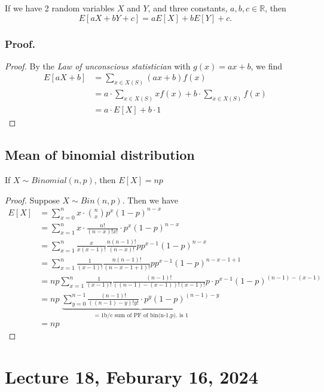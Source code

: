 \documentclass[
]{book}
\theoremstyle{definition}
\theoremstyle{definition}
\theoremstyle{definition}
\theoremstyle{definition}
\theoremstyle{remark}
\begin{document}
If we have 2 random variables \(X\) and \(Y\), and three constants, \(a,b,c\in \mathbb{R}\), then
\[
  E[aX+bY + c] = aE[X] + bE[Y] +c.
\]

\subsection{Proof.}\label{proof.}

\begin{proof}
By the \emph{Law of unconscious statistician} with \(g(x)=ax+b\), we find
\begin{align*}
E[aX+b] &=\sum_{x\in X(S)} (ax+b) f(x)\\
& = a \cdot  \sum_{x\in X(S)} x f(x) + b  \cdot \sum_{x\in X(S)} f(x) \\
&= a\cdot  E[X]  + b \cdot 1
\end{align*}
\end{proof}

\section{Mean of binomial distribution}\label{mean-of-binomial-distribution}

If \(X \sim Binomial(n,p)\), then \(E[X] = np\)

\begin{proof}
Suppose \(X \sim Bin(n,p)\). Then we have
\begin{align*}
E[X] &= \sum_{x=0}^n x\cdot \binom{n}{x}  p^x (1-p)^{n-x}\\
&= \sum_{x=1}^n x\cdot \frac{n!}{(n-x)!x!} \cdot p^x (1-p)^{n-x}\\
&= \sum_{x=1}^n \frac{x}{x(x-1)!} \frac{n(n-1)!}{(n-x)!} p p^{x-1} (1-p)^{n-x}\\
&= \sum_{x=1}^n \frac{1}{(x-1)!}\frac{n(n-1)!}{(n-x-1+1)!} p p^{x-1} (1-p)^{n-x-1+1}\\
&= np \sum_{x=1}^n \frac{1}{(x-1)!}\frac{(n-1)!}{((n-1)-(x-1))! (x-1)!} p\cdot p^{x-1} (1-p)^{(n-1)-(x-1)}\\
&= np \; \underbrace{\sum_{y=0}^{n-1} \frac{(n-1)!}{((n-1)-y)! y!} \cdot p^{y} (1-p)^{(n-1)-y}}_{=1\text{b/c sum of PF of bin(n-1,p). is 1}}\\
&= np
\end{align*}
\end{proof}

\chapter{Lecture 18, Feburary 16, 2024}\label{lecture-18-feburary-16-2024}
\end{document}
